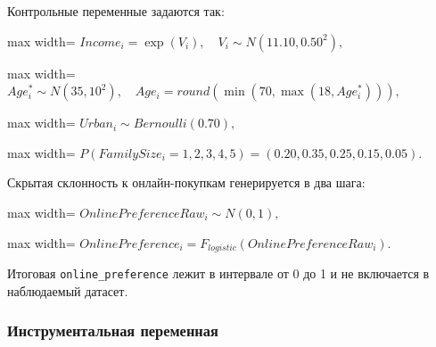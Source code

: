 \documentclass[11pt]{article}
\begin{document}
Контрольные переменные задаются так:

\begin{center}
\begin{adjustbox}{max width=\linewidth}
\(\displaystyle Income_i = \exp(V_i), \quad V_i \sim N(11.10, 0.50^2),\)
\end{adjustbox}
\end{center}

\begin{center}
\begin{adjustbox}{max width=\linewidth}
\(\displaystyle Age_i^* \sim N(35, 10^2), \quad Age_i = round\left(\min(70, \max(18, Age_i^*))\right),\)
\end{adjustbox}
\end{center}

\begin{center}
\begin{adjustbox}{max width=\linewidth}
\(\displaystyle Urban_i \sim Bernoulli(0.70),\)
\end{adjustbox}
\end{center}

\begin{center}
\begin{adjustbox}{max width=\linewidth}
\(\displaystyle P(FamilySize_i = 1,2,3,4,5) = (0.20, 0.35, 0.25, 0.15, 0.05).\)
\end{adjustbox}
\end{center}

Скрытая склонность к онлайн-покупкам генерируется в два шага:

\begin{center}
\begin{adjustbox}{max width=\linewidth}
\(\displaystyle OnlinePreferenceRaw_i \sim N(0, 1),\)
\end{adjustbox}
\end{center}

\begin{center}
\begin{adjustbox}{max width=\linewidth}
\(\displaystyle OnlinePreference_i = F_{logistic}(OnlinePreferenceRaw_i).\)
\end{adjustbox}
\end{center}

Итоговая \texttt{online\_preference} лежит в интервале от 0 до 1 и не
включается в наблюдаемый датасет.

\subsubsection{Инструментальная
переменная}\label{ux438ux43dux441ux442ux440ux443ux43cux435ux43dux442ux430ux43bux44cux43dux430ux44f-ux43fux435ux440ux435ux43cux435ux43dux43dux430ux44f}
\end{document}

